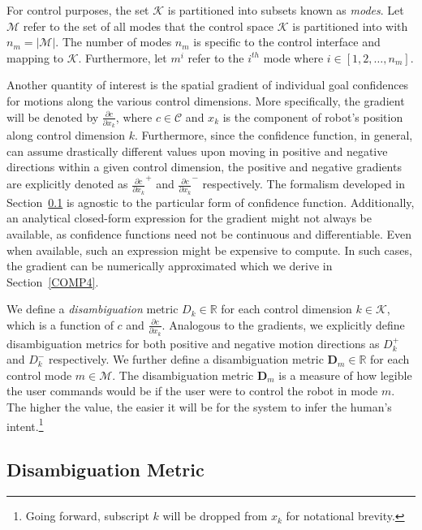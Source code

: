 \documentclass[conference]{IEEEtran}
\begin{document}
For control purposes, the set $\mathcal{K}$ is partitioned into subsets known as \textit{modes}. Let $\mathcal{M}$ refer to the set of all modes that the control space $\mathcal{K}$ is partitioned into with $n_{m} = \vert\mathcal{M}\vert$. The number of modes $n_{m}$ is specific to the control interface and mapping to $\mathcal{K}$. Furthermore, let $m^{i}$ refer to the $i^{th}$ mode where $i \in [1,2,\dots,n_{m}]$.

Another quantity of interest is the spatial gradient of individual goal confidences for motions along the various control dimensions. More specifically, the gradient will be denoted by $\frac{\partial c}{\partial x_k}$, where $c \in \mathcal{C}$ and $x_k$ is the component of robot's position along control dimension $k$. Furthermore, since the confidence function, in general, can assume drastically different values upon moving in positive and negative directions within a given control dimension, the positive and negative gradients are explicitly denoted as $\frac{\partial c}{\partial x_k}^{+}$ and $\frac{\partial c}{\partial x_k}^{-}$ respectively. The formalism developed in Section~\ref{DM} is agnostic to the particular form of confidence function. Additionally, an analytical closed-form expression for the gradient might not always be available, as confidence functions need not be continuous and differentiable. Even when available, such an expression might be expensive to compute. In such cases, the gradient can be numerically approximated which we derive in Section~\ref{COMP4}.

We define a \textit{disambiguation} metric $D_{k}\in \mathbb{R}$ for each control dimension $k \in \mathcal{K}$, which is a function of $c$ and $\frac{\partial c}{\partial x_k}$. Analogous to the gradients, we explicitly define disambiguation metrics for both positive and negative motion directions as $D_{k}^{+}$ and $D_{k}^{-}$ respectively.
We further define a disambiguation metric $\boldsymbol{D}_m \in \mathbb{R}$ for each control mode $m \in \mathcal{M}$.
The disambiguation metric $\boldsymbol{D}_m$ is a measure of how legible the user commands would be if the user were to control the robot in mode $m$. The higher the value, the easier it will be for the system to infer the human's intent.\footnote{Going forward, subscript $k$ will be dropped from $x_k$ for notational brevity.} 

\subsection{Disambiguation Metric}\label{DM}
\end{document}
